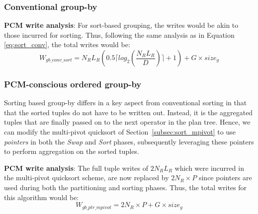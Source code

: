 \subsubsection{Conventional group-by}
\textbf{PCM write analysis}: For sort-based grouping, the writes would
be akin to those incurred for sorting. Thus, following the same analysis
as in Equation \ref{eq:sort_conv}, the total writes would be:
\begin{equation}
\label{eq:gby_conv_sort}
W_{gb\_conv\_sort} = N_RL_R (0.5 \lceil log_2(\frac{N_R L_R}{D}) \rceil + 1) + G \times size_g
\end{equation}	


\subsubsection{PCM-conscious ordered group-by}
\label{subsec:gb_ptr_mpivot} 
Sorting based group-by differs in a key aspect from conventional sorting
in that that the sorted tuples do not have to be written out. Instead, it
is the aggregated tuples that are finally passed on to the next operator
in the plan tree. Hence, we can modify the multi-pivot quicksort of
Section~\ref{subsec:sort_mpivot} to use \emph{pointers} in both the
\textit{Swap} and \textit{Sort} phases, subsequently leveraging these
pointers to perform aggregation on the sorted tuples. 

\textbf{PCM write analysis}: The full tuple writes of $2 N_R L_R$
which were incurred in the multi-pivot quicksort scheme, are
now replaced by $2N_R \times P$ since pointers are used during
both the partitioning and sorting phases. Thus, the total writes for this
algorithm would be:
\begin{equation}
\label{eq:gby_ptr_mpivot}
W_{gb\_ptr\_mpivot} = 2N_R \times P + G \times size_g
\end{equation}

